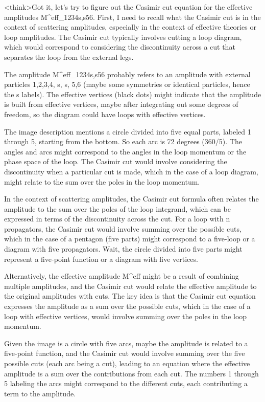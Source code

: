 <think>Got it, let's try to figure out the Casimir cut equation for the effective amplitudes M^eff_1234s,s56. First, I need to recall what the Casimir cut is in the context of scattering amplitudes, especially in the context of effective theories or loop amplitudes. The Casimir cut typically involves cutting a loop diagram, which would correspond to considering the discontinuity across a cut that separates the loop from the external legs. 

The amplitude M^eff_1234s,s56 probably refers to an amplitude with external particles 1,2,3,4, s, s, 5,6 (maybe some symmetries or identical particles, hence the s labels). The effective vertices (black dots) might indicate that the amplitude is built from effective vertices, maybe after integrating out some degrees of freedom, so the diagram could have loops with effective vertices. 

The image description mentions a circle divided into five equal parts, labeled 1 through 5, starting from the bottom. So each arc is 72 degrees (360/5). The angles and arcs might correspond to the angles in the loop momentum or the phase space of the loop. The Casimir cut would involve considering the discontinuity when a particular cut is made, which in the case of a loop diagram, might relate to the sum over the poles in the loop momentum. 

In the context of scattering amplitudes, the Casimir cut formula often relates the amplitude to the sum over the poles of the loop integrand, which can be expressed in terms of the discontinuity across the cut. For a loop with n propagators, the Casimir cut would involve summing over the possible cuts, which in the case of a pentagon (five parts) might correspond to a five-loop or a diagram with five propagators. Wait, the circle divided into five parts might represent a five-point function or a diagram with five vertices. 

Alternatively, the effective amplitude M^eff might be a result of combining multiple amplitudes, and the Casimir cut would relate the effective amplitude to the original amplitudes with cuts. The key idea is that the Casimir cut equation expresses the amplitude as a sum over the possible cuts, which in the case of a loop with effective vertices, would involve summing over the poles in the loop momentum. 

Given the image is a circle with five arcs, maybe the amplitude is related to a five-point function, and the Casimir cut would involve summing over the five possible cuts (each arc being a cut), leading to an equation where the effective amplitude is a sum over the contributions from each cut. The numbers 1 through 5 labeling the arcs might correspond to the different cuts, each contributing a term to the amplitude. 

